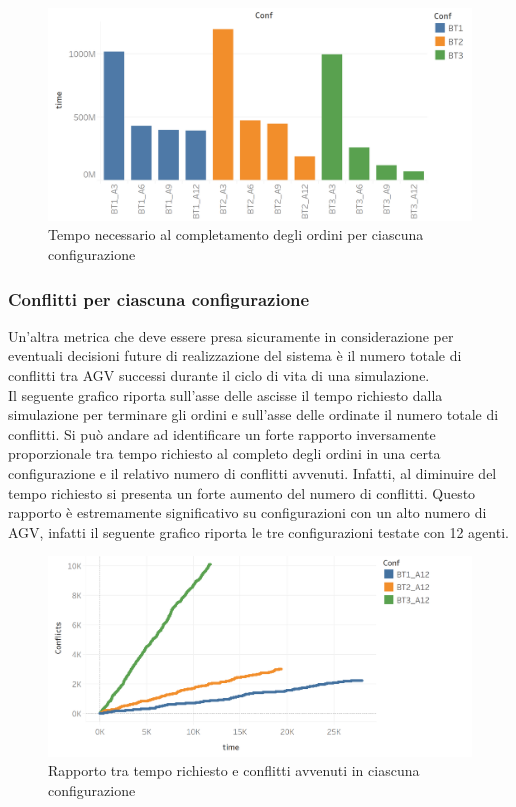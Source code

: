\documentclass[12pt]{article}
\begin{document}
\begin{figure}[H]
\centering
  \includegraphics[width=1\linewidth]{Figures/Results_Graphics/Time_Total.png}
  \caption{Tempo necessario al completamento degli ordini per ciascuna configurazione}\label{fig:articles_agv_bt1}
\end{figure}

\newpage

\subsubsection{Conflitti per ciascuna configurazione}
Un'altra metrica che deve essere presa sicuramente in considerazione per eventuali decisioni future di realizzazione del sistema è il numero totale di conflitti tra AGV successi durante il ciclo di vita di una simulazione.\\
Il seguente grafico riporta sull'asse delle ascisse il tempo richiesto dalla simulazione per terminare gli ordini e sull'asse delle ordinate il numero totale di conflitti. Si può andare ad identificare un forte rapporto inversamente proporzionale tra tempo richiesto al completo degli ordini in una certa configurazione e il relativo numero di conflitti avvenuti. Infatti, al diminuire del tempo richiesto si presenta un forte aumento del numero di conflitti. Questo rapporto è estremamente significativo su configurazioni con un alto numero di AGV, infatti il seguente grafico riporta le tre configurazioni testate con 12 agenti.
\begin{figure}[H]
\centering
  \includegraphics[width=1\linewidth]{Figures/Results_Graphics/Rapporto_tempoconflitti.png}
  \caption{Rapporto tra tempo richiesto e conflitti avvenuti in ciascuna configurazione}\label{fig:articles_agv_bt1}
\end{figure}
\end{document}

